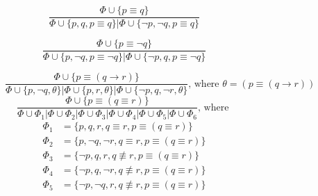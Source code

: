\documentclass{article}
\theoremstyle{definition}
\newcommand*{\id}{\equiv}
\newcommand*{\ra}{\rightarrow}
\begin{document}
\begin{figure}
    \begin{subfigure}{\textwidth}
        \begin{subfigure}{0.48\textwidth}
            \begin{equation}
                \tag{$ \eq_\top $}
                \frac{
                    \Phi \cup \{ p \id q \} }%
                { \Phi \cup \{ p, q, p\id q \} | \Phi \cup \{ \lnot p, \lnot q, p\id q \} }
            \end{equation}
        \end{subfigure}
        \begin{subfigure}{0.48\textwidth}
            \begin{equation}
                \tag{$ \eq_\top^\lnot $}
                \frac{
                    \Phi \cup \{ p \id \lnot q \} }%
                { \Phi \cup \{ p, \lnot q, p \id \lnot q \} | \Phi \cup \{ \lnot p, q, p\id \lnot q \} }
            \end{equation}
        \end{subfigure}
        \begin{equation}
            \tag{$ \eq_\top^\ra $}
            \frac{
                \Phi \cup \{ p \id (q \ra r) \} }%
            { \Phi \cup \{ p, \lnot q, \theta \} | \Phi \cup \{ p, r, \theta \} | \Phi \cup \{ \lnot p, q, \lnot r, \theta \}}
            \text{, where } \theta = (p \id (q \ra r))
        \end{equation}
        \begin{equation}
            \tag{$ \eq_\top^\id $}
            \frac{
                \Phi \cup \{ p \id (q \id r) \} }%
            { \Phi \cup \Phi_1 |
                \Phi \cup \Phi_2 |
                \Phi \cup \Phi_3 |
                \Phi \cup \Phi_4 |
                \Phi \cup \Phi_5 |
                \Phi \cup \Phi_6
            }
            \text{, where }
        \end{equation}
        \[
            \begin{aligned}
                \Phi_1 & = \{p, q, r, q \id r, p \id (q \id r) \}                       \\
                \Phi_2 & = \{p, \lnot q, \lnot r, q \id r, p \id (q \id r) \}           \\
                \Phi_3 & = \{\lnot p, q, r, q \not \id r, p \id (q \id r) \}            \\
                \Phi_4 & = \{\lnot p, q, \lnot r, q \not \id r, p \id (q \id r) \}      \\
                \Phi_5 & = \{\lnot p,\lnot q, r, q \not \id r, p \id (q \id r) \}       \\

\end{aligned}\]
\end{subfigure}
\end{figure}
\end{document}
